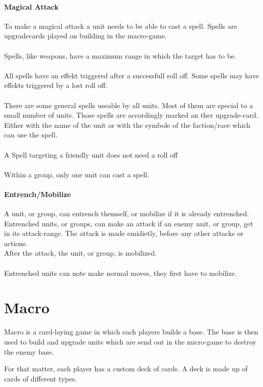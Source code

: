 \documentclass[a5paper,pagesize,10pt,bibtotoc,pointlessnumbers,
normalheadings,DIV=9,twoside=false]{scrbook}
\begin{document}
\subsubsection{Magical Attack}
To make a magical attack a unit needs to be able to cast a spell. Spells are upgradecards played on building in the macro-game.\\
\\
Spells, like weapons, have a maximum range in which the target has to be.\\
\\
All spells have an effekt triggered after a successfull roll off. Some spells may have effekts triggered by a lost roll off.\\
\\
There are some general spells useable by all units. Most of them are special to a small number of units. Those spells are accordingly marked an ther upgrade-card. Either with the name of the unit or with the symbole of the faction/race which can use the spell.\\
\\
A Spell targeting a friendly unit does not need a roll off\\
\\
Within a group, only one unit can cast a spell.

\subsubsection{Entrench/Mobilize}
A unit, or group, can entrench themself, or mobilize if it is already entrenched.
Entrenched units, or groups, can make an attack if an enemy unit, or group, get in its attack-range.
The attack is made emidietly, before any other attacks or actions.\\
After the attack, the unit, or group, is mobilized.\\
\\
Entrenched units can note make normal moves, they first have to mobilize.

\chapter{Macro}
Macro is a card-laying game in which each players builds a base. The base is then used to build and upgrade units which are send out in the micro-game to destroy the enemy base.

For that matter, each player has a custom deck of cards. A deck is made up of cards of different types.
\end{document}

